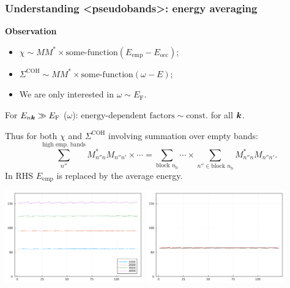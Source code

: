 \documentclass[t]{beamer}
\newcommand{\shortcode}[1]{\texttt{#1}}
\newcommand*{\const}{\text{const}}
\def\texttt#1{<#1>}%
\begin{document}
\begin{frame}[allowframebreaks]
\frametitle{Understanding \shortcode{pseudobands}: energy averaging}

\textbf{Observation} 
\begin{itemize}
    \item $\chi \sim M M^* \times \text{some-function}(E_{\text{emp}} - E_{\text{occ}})$;
    \item $\Sigma^{\text{COH}} \sim M M^* \times \text{some-function}(\omega - E)$; 
    \item We are only interested in $\omega \sim E_{\text{F}}$.
\end{itemize}

\vspace{0.5cm}

\faHandPointRight For $E_{n \vb*{k}} \gg E_{\text{F}}$ ($\omega$):  
$\text{energy-dependent factors} \sim \const.$ for all $\vb*{k}$.

\vspace{0.5cm}

Thus for both $\chi$ and $\Sigma^{\text{COH}}$ involving summation over empty bands:
\begin{equation}
    \sum_{n''}^{\text{high emp. bands}} M_{n'' n}^* M_{n'' n'} \times \cdots 
    = \sum_{\text{block $n_{\text{b}}$}} \cdots \times \sum_{n'' \in \text{block $n_{\text{b}}$}}
    M_{n'' n}^* M_{n'' n'}.
\end{equation}
In RHS $E_{\text{emp}}$ is replaced by the average energy.

\framebreak

\begin{center}
    \includegraphics[width=0.45\textwidth]{../data/energy/energies-different-blocks.png}
    \includegraphics[width=0.45\textwidth]{../data/energy/energies-same-blocks-1062.png}
\end{center}


\end{frame}
\end{document}
